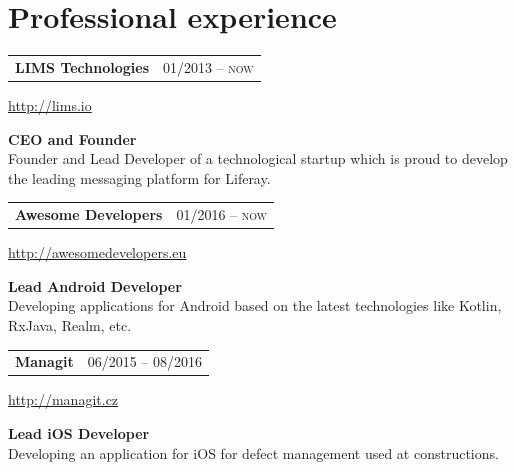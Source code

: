 \documentclass[10pt]{article} %
\begin{document}
\begin{minipage}[t]{0.44\textwidth} %
\vspace{122pt} %
	
	

\section{Professional experience} 
\medskip

\begin{tabularx}{\textwidth}{@{}Xr@{}}
\large\textbf{LIMS Technologies} & \small\textsc{01/2013 -- now} \\
\end{tabularx}
\normalsize\url{http://lims.io}

\medskip
\normalsize\textbf{CEO and Founder}\\
\normalsize {Founder and Lead Developer of a technological startup which is proud to 
develop the leading messaging platform for Liferay.}\\
\medskip 


\begin{tabularx}{\textwidth}{@{}Xr@{}}
\large\textbf{Awesome Developers} & \small\textsc{01/2016 -- now} \\
\end{tabularx}
\normalsize\url{http://awesomedevelopers.eu}

\medskip
\normalsize\textbf{Lead Android Developer}\\
\normalsize {Developing applications for Android based on the latest \newline technologies like Kotlin, RxJava,
Realm, etc.}\\
\medskip 


\begin{tabularx}{\textwidth}{@{}Xr@{}}
\large\textbf{Managit} & \small\textsc{06/2015 -- 08/2016} \\
\end{tabularx}
\normalsize\url{http://managit.cz}

\medskip
\normalsize\textbf{Lead iOS Developer}\\
\normalsize {Developing an application for iOS for \newline defect management used at constructions.}\\
\medskip 


\end{minipage}
\end{document}
